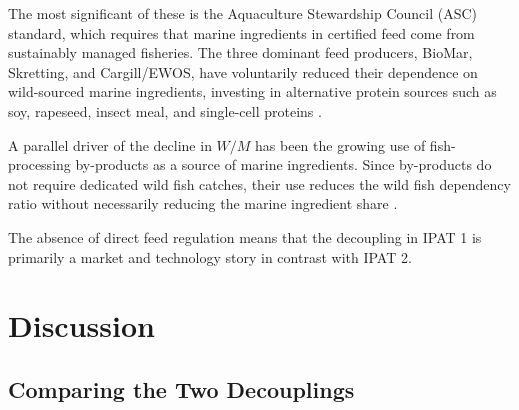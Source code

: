 \documentclass[12pt, a4paper]{report}
\begin{document}
The most significant of these is the Aquaculture Stewardship Council (ASC) standard, which requires that marine ingredients in certified feed come from sustainably managed fisheries. The three dominant feed producers, BioMar, Skretting, and Cargill/EWOS, have voluntarily reduced their dependence on wild-sourced marine ingredients, investing in alternative protein sources such as soy, rapeseed, insect meal, and single-cell proteins \citep{frontiers2024}.

A parallel driver of the decline in $W/M$ has been the growing use of fish-processing by-products as a source of marine ingredients. Since by-products do not require dedicated wild fish catches, their use reduces the wild fish dependency ratio without necessarily reducing the marine ingredient share \citep{ytrestoeyl2015}.

The absence of direct feed regulation means that the decoupling in IPAT 1 is primarily a market and technology story in contrast with IPAT 2.
















\chapter{Discussion}


\section{Comparing the Two Decouplings}
\end{document}
